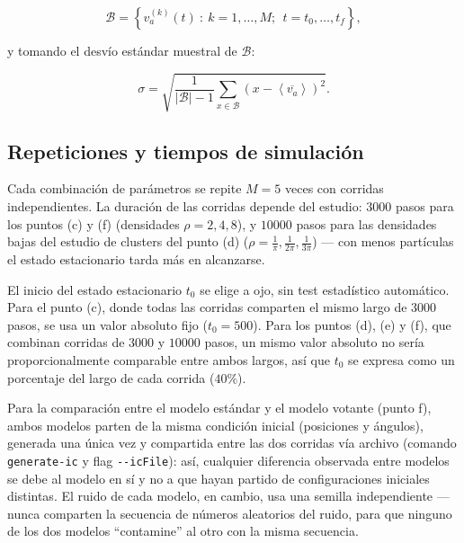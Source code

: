 \documentclass[a4paper,11pt]{article}
\begin{document}
\begin{equation}
  \mathcal{B} = \left\{ v_a^{(k)}(t) \ :\ k = 1,\dots,M;\ \ t = t_0,\dots,t_f \right\},
\end{equation}

y tomando el desvío estándar muestral de $\mathcal{B}$:

\begin{equation}
  \sigma = \sqrt{\frac{1}{|\mathcal{B}| - 1}\sum_{x \in \mathcal{B}} \left(x - \left\langle \overline{v_a} \right\rangle\right)^2}.
  \label{eq:desvio}
\end{equation}

\subsection{Repeticiones y tiempos de simulación}
\label{sec:repeticiones}

Cada combinación de parámetros se repite $M = 5$ veces con corridas
independientes. La duración de las corridas depende del estudio: $3000$
pasos para los puntos (c) y (f) (densidades $\rho = 2, 4, 8$), y $10000$
pasos para las densidades bajas del estudio de clusters del punto (d)
($\rho = \tfrac{1}{\pi}, \tfrac{1}{2\pi}, \tfrac{1}{3\pi}$) --- con menos
partículas el estado estacionario tarda más en alcanzarse.

El inicio del estado estacionario $t_0$ se elige a ojo, sin test
estadístico automático. Para el punto (c), donde todas las corridas
comparten el mismo largo de $3000$ pasos, se usa un valor absoluto fijo
($t_0 = 500$). Para los puntos (d), (e) y (f), que combinan corridas de
$3000$ y $10000$ pasos, un mismo valor absoluto no sería proporcionalmente
comparable entre ambos largos, así que $t_0$ se expresa como un porcentaje
del largo de cada corrida ($40\%$).

Para la comparación entre el modelo estándar y el modelo votante (punto f),
ambos modelos parten de la misma condición inicial (posiciones y ángulos),
generada una única vez y compartida entre las dos corridas vía archivo
(comando \texttt{generate-ic} y flag \texttt{-{}-icFile}): así, cualquier
diferencia observada entre modelos se debe al modelo en sí y no a que
hayan partido de configuraciones iniciales distintas. El ruido de cada
modelo, en cambio, usa una semilla independiente --- nunca comparten la
secuencia de números aleatorios del ruido, para que ninguno de los dos
modelos ``contamine'' al otro con la misma secuencia.

\end{document}
